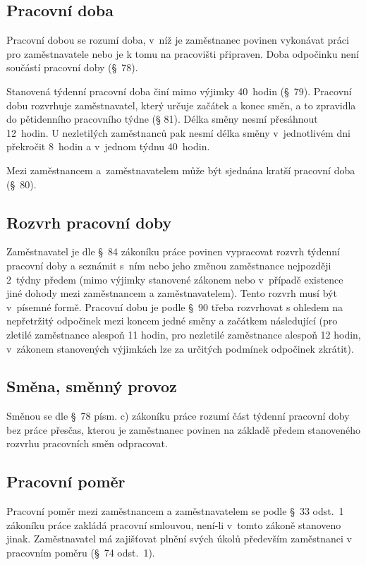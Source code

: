 \documentclass[twoside]{ctuthesis}
\begin{document}
\subsection{Pracovní doba}
Pracovní dobou se rozumí doba, v~níž je zaměstnanec povinen vykonávat práci pro zaměstnavatele nebo je k tomu na pracovišti připraven. Doba odpočinku není součástí pracovní doby (§~78).

Stanovená týdenní pracovní doba činí mimo výjimky 40~hodin (§~79). Pracovní dobu rozvrhuje zaměstnavatel, který určuje začátek a konec směn, a to zpravidla do pětidenního pracovního týdne (§ 81). Délka směny nesmí přesáhnout 12~hodin. U nezletilých zaměstnanců pak nesmí délka směny v~jednotlivém dni překročit 8~hodin a v~jednom týdnu 40~hodin.

Mezi zaměstnancem a~zaměstnavatelem může být sjednána kratší pracovní doba (§~80).

\subsection{Rozvrh pracovní doby}
Zaměstnavatel je dle §~84 zákoníku práce povinen vypracovat rozvrh týdenní pracovní doby a seznámit s~ním nebo jeho změnou zaměstnance nejpozději 2~týdny předem (mimo výjimky stanovené zákonem nebo v~případě existence jiné dohody mezi zaměstnancem a zaměstnavatelem). Tento rozvrh musí být v~písemné formě. Pracovní dobu je podle §~90 třeba rozvrhovat s ohledem na nepřetržitý odpočinek mezi koncem jedné směny a začátkem následující (pro zletilé zaměstnance alespoň 11 hodin, pro nezletilé zaměstnance alespoň 12 hodin, v~zákonem stanovených výjimkách lze za určitých podmínek odpočinek zkrátit).

\subsection{Směna, směnný provoz}
Směnou se dle §~78 písm. c) zákoníku práce rozumí část týdenní pracovní doby bez práce přesčas, kterou je zaměstnanec povinen na základě předem stanoveného rozvrhu pracovních směn odpracovat.

\subsection{Pracovní poměr}
Pracovní poměr mezi zaměstnancem a zaměstnavatelem se podle §~33 odst.~1 zákoníku práce zakládá pracovní smlouvou, není-li v~tomto zákoně stanoveno jinak. Zaměstnavatel má zajišťovat plnění svých úkolů především zaměstnanci v pracovním poměru (§~74 odst.~1).
\end{document}
